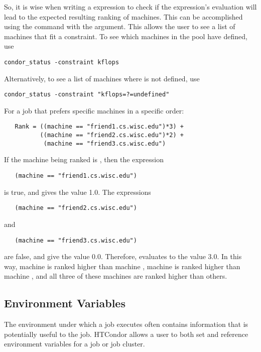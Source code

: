 So, it is wise when writing a  expression to check
if the expression's evaluation will lead to the expected
resulting ranking of machines.
This can be accomplished using the  command with the
 argument.  This allows the user to see a list of
machines that fit a constraint.
To see which machines in the pool have  defined,
use
\begin{verbatim}
condor_status -constraint kflops
\end{verbatim}
Alternatively, to see a list of machines where 
 is not defined, use
\begin{verbatim}
condor_status -constraint "kflops=?=undefined"
\end{verbatim}

For a job that prefers specific machines in a specific order:
\begin{verbatim}
   Rank = ((machine == "friend1.cs.wisc.edu")*3) +
          ((machine == "friend2.cs.wisc.edu")*2) +
           (machine == "friend3.cs.wisc.edu")
\end{verbatim}
If the machine being ranked is , then the
expression
\begin{verbatim}
   (machine == "friend1.cs.wisc.edu")
\end{verbatim}
is true, and gives the value 1.0.
The expressions
\begin{verbatim}
   (machine == "friend2.cs.wisc.edu")
\end{verbatim}
and
\begin{verbatim}
   (machine == "friend3.cs.wisc.edu")
\end{verbatim}
are false, and give the value 0.0.
Therefore,  evaluates to the value 3.0.
In this way, machine  is ranked higher than
machine ,
machine 
is ranked higher than 
machine ,
and all three of these machines are ranked higher than others.



\subsection{Environment Variables}

The environment under which a job executes often contains
information that is potentially useful to the job.
HTCondor allows a user to both set and reference environment
variables for a job or job cluster.

